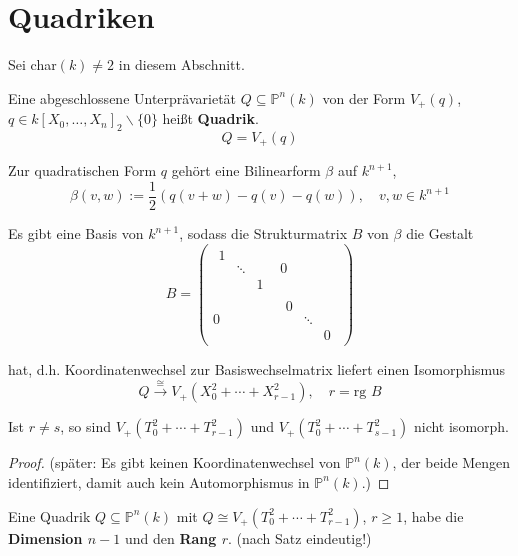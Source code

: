 \section{Quadriken}
\label{sec:quadriken}

Sei char$(k)\neq2$ in diesem Abschnitt.
\begin{defn}[orig. 57]
  \label{def:quadrik}
  Eine abgeschlossene Unterprävarietät $Q\subseteq\mathbb{P}^{n}(k)$
  von der Form $V_{+}(q)$, $q\in k[X_{0},\ldots,X_{n}]_{2}\backslash\{0\}$
  heißt \textbf{Quadrik}.
  \[
    Q=V_{+}(q)
  \]

  Zur quadratischen Form $q$ gehört eine Bilinearform $\beta$ auf
  $k^{n+1}$, 
  \[
    \beta(v,w):=\frac{1}{2}(q(v+w)-q(v)-q(w)),\quad v,w\in k^{n+1}
  \]

Es gibt eine Basis von $k^{n+1}$, sodass die Strukturmatrix $B$
von $\beta$ die Gestalt
\[
  B=\begin{pmatrix}
    \begin{array}{ccc}
      1\\
      & \ddots\\
      &  & 1
    \end{array} & 0\\
    0 &
    \begin{array}{ccc}
      0\\
      & \ddots\\
      &  & 0
    \end{array}
  \end{pmatrix}
\]

hat, d.h. Koordinatenwechsel zur Basiswechselmatrix liefert einen
Isomorphismus
\[
  Q\xrightarrow{\cong}V_{+}(X_{0}^{2}+\cdots+X_{r-1}^{2}),\quad r=\text{rg }B
\]
\end{defn}
\begin{lem}[orig. 58]
  \label{lem:platzhalter}
\end{lem}
\begin{prop}[orig. 59]
  \label{prop:quadrik-in-normalform}
  Ist $r\neq s$, so sind $V_{+}(T_{0}^{2}+\cdots+T_{r-1}^{2})$ und
  $V_{+}(T_{0}^{2}+\cdots+T_{s-1}^{2})$ nicht isomorph.
\end{prop}
\begin{proof}
  (später: Es gibt keinen Koordinatenwechsel von $\mathbb{P}^{n}(k)$,
  der beide Mengen identifiziert, damit auch kein Automorphismus in
  $\mathbb{P}^{n}(k)$.)
\end{proof}

\begin{defn}
  \label{def:dim-und-rang-einer-quadrik}
  Eine Quadrik $Q\subseteq\mathbb{P}^{n}(k)$ mit $Q\cong V_{+}(T_{0}^{2}+\cdots+T_{r-1}^{2})$,
  $r\geq1$, habe die \textbf{Dimension $n-1$} und den \textbf{Rang $r$}. (nach Satz eindeutig!)
\end{defn}

